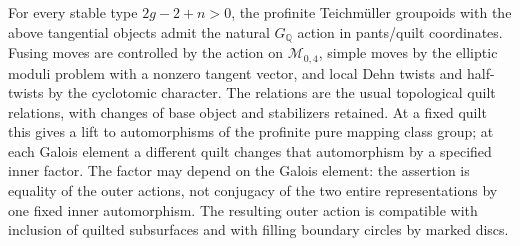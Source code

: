 \begin{theorem}
\label{A:arithmetic-quilts}
For every stable type $2g-2+n>0$, the profinite Teichm\"uller groupoids
with the above tangential objects admit the natural $G_{\mathbb Q}$
action in pants/quilt coordinates. Fusing moves are controlled by the
action on $\mathcal M_{0,4}$, simple moves by the elliptic moduli problem
with a nonzero tangent vector, and local Dehn twists and half-twists by
the cyclotomic character. The relations are the usual topological
quilt relations, with changes of base object and stabilizers retained.
At a fixed quilt this gives a lift to automorphisms of the profinite
pure mapping class group; at each Galois element a different
quilt changes that automorphism by a specified inner factor.
The factor may depend on the Galois element: the assertion is
equality of the outer actions, not conjugacy of the two entire
representations by one fixed inner automorphism. The resulting
outer action is compatible with
inclusion of quilted subsurfaces and with filling boundary circles by
marked discs.
\end{theorem}

